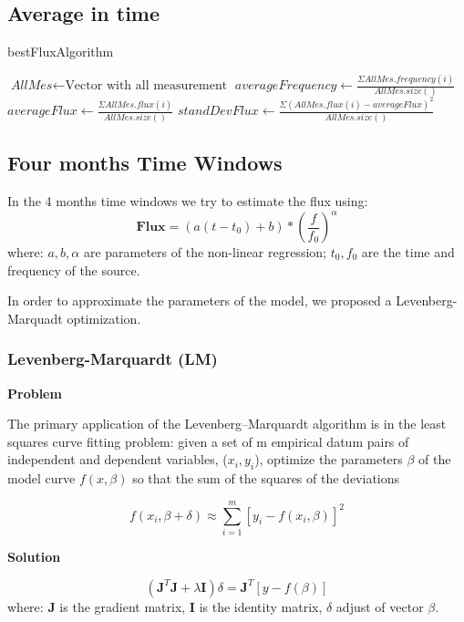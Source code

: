 \documentclass[10pt]{article}
\begin{document}
\subsection{Average in time}
\begin{algorithm}[H]
\caption{bestFluxAlgorithm}\label{4months}
\begin{algorithmic}[1]
\State $\textit{AllMes} \gets \text{Vector with all measurement}$
\Statex
\State $\textit{averageFrequency} \gets \frac{\Sigma AllMes.frequency(i)}{AllMes.size()}$
\Statex
\State $\textit{averageFlux} \gets \frac{\Sigma AllMes.flux(i)}{AllMes.size()}$
\Statex
\State $\textit{standDevFlux} \gets \frac{\Sigma (AllMes.flux(i) - averageFlux)^2}{AllMes.size()}$
\Statex
\State {}
\EndProcedure
\end{algorithmic}
\end{algorithm}

\subsection{Four months Time Windows}
In the 4 months time windows we try to estimate the flux using:
$$ \mathbf{Flux} = (a(t-t_0)+b)*\left(\frac{f}{f_0}\right)^\alpha $$
where: $a,b,\alpha$ are parameters of the non-linear regression; $t_0, f_0$ are
the time and frequency of the source.

In order to approximate the parameters of the model, we proposed a
Levenberg-Marquadt optimization. 

\subsubsection{Levenberg-Marquardt (LM)}
\textbf{Problem} 

The primary application of the Levenberg–Marquardt algorithm is in the least
squares curve fitting problem: given a set of m empirical datum pairs of
independent and dependent variables, ($x_i, y_i$), optimize the parameters
$\beta$ of the model curve $f(x,\beta)$ so that the sum of the squares of the
deviations

$$ f(x_i, \beta + \delta) \approx \sum\limits_{i=1}^m [y_i - f(x_i, \beta)]^2 $$

\noindent\textbf{Solution} 

$$ (\mathbf{J}^{T}\mathbf{J} + \lambda\mathbf{I})\delta = \mathbf{J}^{T}[y - f(\beta)] $$
where: $\mathbf{J}$ is the gradient matrix, $\mathbf{I}$ is the identity matrix, $\delta$ adjust of vector $\beta$.
\end{document}
